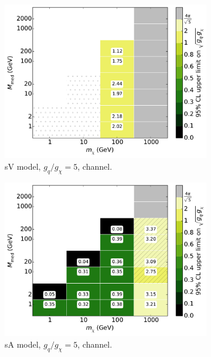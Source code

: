 \begin{figure}
\begin{subfigure}[t]{0.32\textwidth}
    \centering
    \includegraphics[width=1.\textwidth]{figures/grid_basepoints_SVD_rat5_monoWZ.pdf}
    \caption{sV model, $g_q/g_{\chi} = 5$, \monoWZ channel.}
    \vspace{0.75cm}
  \end{subfigure}
  \begin{subfigure}[t]{0.32\textwidth}
    \centering
    \includegraphics[width=1.\textwidth]{figures/grid_basepoints_SVD_rat5_monojet.pdf} %
    \caption{sA model, $g_q/g_{\chi} = 5$, \monojet channel.}
  \end{subfigure}
  \begin{subfigure}[t]{0.32\textwidth}
    \centering

\end{subfigure}
\end{figure}
